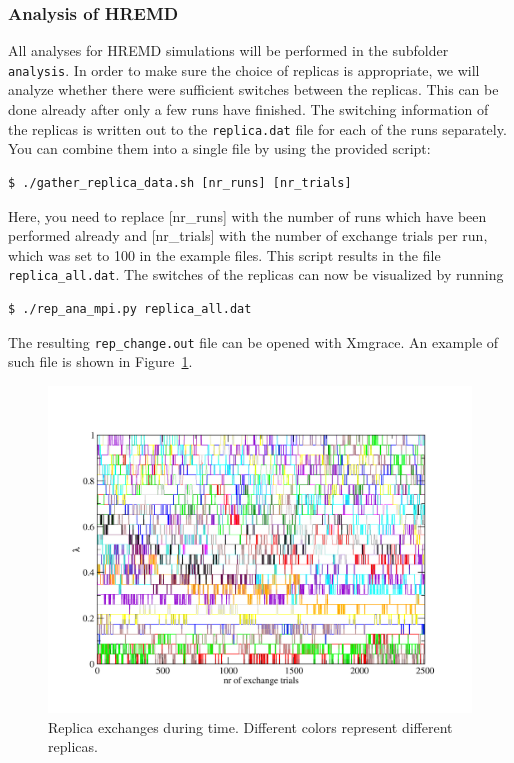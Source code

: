 \subsubsection{Analysis of HREMD}
All analyses for HREMD simulations will be performed in the subfolder \texttt{analysis}. 
In order to make sure the choice of replicas is appropriate, we will analyze whether there were sufficient switches between the replicas. This can be done already after only a few runs have finished. 
The switching information of the replicas is written out to the \texttt{replica.dat} file for each of the runs separately. 
You can combine them into a single file by using the provided script:
\begin{lstlisting}
$ ./gather_replica_data.sh [nr_runs] [nr_trials]
\end{lstlisting}
Here, you need to replace [nr\_runs] with the number of runs which have been performed already and [nr\_trials] with the number of exchange trials per run, which was set to 100 in the example files.
This script results in the file \texttt{replica\_all.dat}. The switches of the replicas can now be visualized by running
\begin{lstlisting}
$ ./rep_ana_mpi.py replica_all.dat
\end{lstlisting}
The resulting \texttt{rep\_change.out} file can be opened with \linebreak Xmgrace. An example of such file is shown in  Figure~\ref{rep_change}.

\begin{figure}[H]
\centering
\includegraphics[scale=.3]{../06_tutorial_03/figures/rep_change}
\caption{Replica exchanges during time. Different colors represent different replicas.}
\label{rep_change}
\end{figure}

